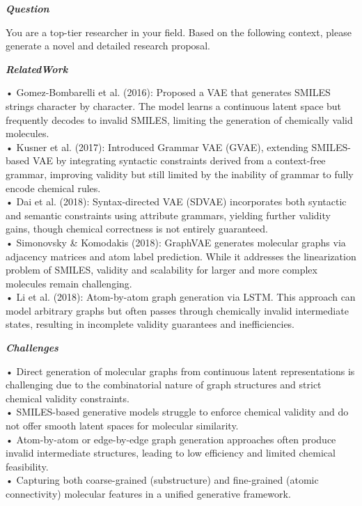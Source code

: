 \begin{tcolorbox}[
    breakable,
    title={Example of Idea Generation in Chemistry},
    colback=LighterGray,
    colframe=DeepPurple,
    colbacktitle=DeepPurple,
    coltitle=White,
]
\textbf{\emph{\textcolor{DeepPurple}{Question}}}

You are a top-tier researcher in your field. Based on the following context, please generate a novel and detailed research proposal.

\textbf{\emph{\textcolor{CaseOrange}{RelatedWork}}}

• Gomez-Bombarelli et al. (2016): Proposed a VAE that generates SMILES strings character by character. The model learns a continuous latent space but frequently decodes to invalid SMILES, limiting the generation of chemically valid molecules. \\
• Kusner et al. (2017): Introduced Grammar VAE (GVAE), extending SMILES-based VAE by integrating syntactic constraints derived from a context-free grammar, improving validity but still limited by the inability of grammar to fully encode chemical rules. \\
• Dai et al. (2018): Syntax-directed VAE (SDVAE) incorporates both syntactic and semantic constraints using attribute grammars, yielding further validity gains, though chemical correctness is not entirely guaranteed. \\
• Simonovsky \& Komodakis (2018): GraphVAE generates molecular graphs via adjacency matrices and atom label prediction. While it addresses the linearization problem of SMILES, validity and scalability for larger and more complex molecules remain challenging. \\
• Li et al. (2018): Atom-by-atom graph generation via LSTM. This approach can model arbitrary graphs but often passes through chemically invalid intermediate states, resulting in incomplete validity guarantees and inefficiencies. 

\textbf{\emph{\textcolor{CaseOrange}{Challenges}}}

• Direct generation of molecular graphs from continuous latent representations is challenging due to the combinatorial nature of graph structures and strict chemical validity constraints. \\
• SMILES-based generative models struggle to enforce chemical validity and do not offer smooth latent spaces for molecular similarity. \\
• Atom-by-atom or edge-by-edge graph generation approaches often produce invalid intermediate structures, leading to low efficiency and limited chemical feasibility. \\
• Capturing both coarse-grained (substructure) and fine-grained (atomic connectivity) molecular features in a unified generative framework. 


\end{tcolorbox}
